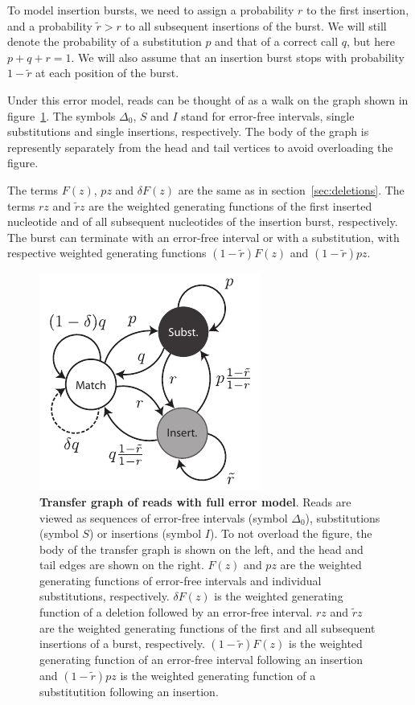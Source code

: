 \documentclass{article}
\begin{document}
To model insertion bursts, we need to assign a probability $r$ to the
first insertion, and a probability $\tilde{r} > r$ to all subsequent
insertions of the burst. We will still denote the probability of a
substitution $p$ and that of a correct call $q$, but here $p+q+r=1$. We
will also assume that an insertion burst stops with probability
$1-\tilde{r}$ at each position of the burst.

Under this error model, reads can be thought of as a walk on the graph
shown in figure~\ref{fig:insertions}. The symbols $\Delta_0$, $S$ and $I$
stand for error-free intervals, single substitutions and single
insertions, respectively. The body of the graph is represently separately
from the head and tail vertices to avoid overloading the figure.

The terms $F(z)$, $pz$ and $\delta F(z)$ are the same as in
section~\ref{sec:deletions}. The terms $rz$ and $\tilde{r}z$ are the
weighted generating functions of the first inserted nucleotide and of all
subsequent nucleotides of the insertion burst, respectively. The burst can
terminate with an error-free interval or with a substitution, with
respective weighted generating functions $(1-\tilde{r})F(z)$ and
$(1-\tilde{r})pz$.


\begin{figure}[h]
\centering
\includegraphics[scale=0.9]{insertions.pdf}
\caption{\textbf{Transfer graph of reads with full error model}. Reads are
viewed as sequences of error-free intervals (symbol $\Delta_0$),
substitutions (symbol $S$) or insertions (symbol $I$). To not overload the
figure, the body of the transfer graph is shown on the left, and the head
and tail edges are shown on the right. $F(z)$ and $pz$ are the weighted
generating functions of error-free intervals and individual substitutions,
respectively. $\delta F(z)$ is the weighted generating function of a
deletion followed by an error-free interval. $rz$ and $\tilde{r}z$ are the
weighted generating functions of the first and all subsequent insertions
of a burst, respectively. $(1-\tilde{r})F(z)$ is the weighted generating
function of an error-free interval following an insertion and
$(1-\tilde{r})pz$ is the weighted generating function of a substitutition
following an insertion.}
\label{fig:insertions}
\end{figure}
\end{document}
